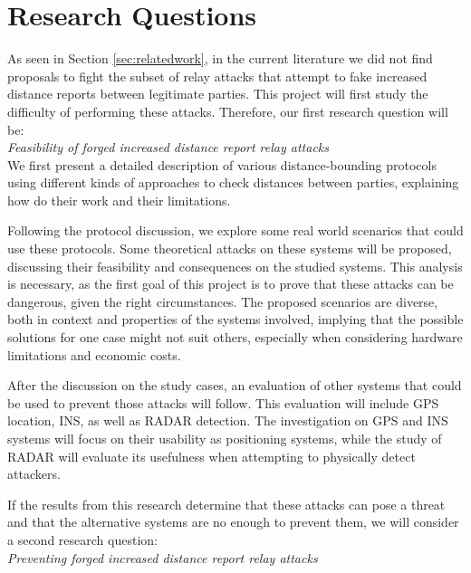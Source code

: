\documentclass{article}
\begin{document}
\section{Research Questions}
\label{sec:researchquestions}

As seen in Section \ref{sec:relatedwork}, in the current literature we did not find proposals to fight the subset of relay attacks that attempt to fake increased distance reports between legitimate parties. This project will first study the difficulty of performing these attacks. Therefore, our first research question will be:\\

\emph{Feasibility of forged increased distance report relay attacks}\\

We first present a detailed description of various distance-bounding protocols using different kinds of approaches to check distances between parties, explaining how do their work and their limitations.

Following the protocol discussion, we explore some real world scenarios that could use these protocols. Some theoretical attacks on these systems will be proposed, discussing their feasibility and consequences on the studied systems. This analysis is necessary, as the first goal of this project is to prove that these attacks can be dangerous, given the right circumstances. The proposed scenarios are diverse, both in context and properties of the systems involved, implying that the possible solutions for one case might not suit others, especially when considering hardware limitations and economic costs.

After the discussion on the study cases, an evaluation of other systems that could be used to prevent those attacks will follow. This evaluation will include GPS location, INS, as well as RADAR detection. The investigation on GPS and INS systems will focus on their usability as positioning systems, while the study of RADAR will evaluate its usefulness when attempting to physically detect attackers.

If the results from this research determine that these attacks can pose a threat and that the alternative systems are no enough to prevent them, we will consider a second research question:\\

\emph{Preventing forged increased distance report relay attacks}\\
\end{document}
